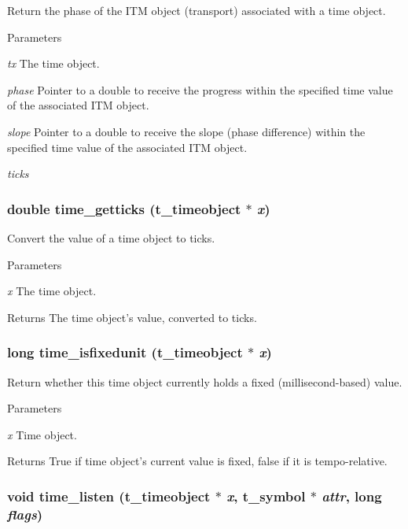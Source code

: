 Return the phase of the ITM object (transport) associated with a time object. 
\begin{DoxyParams}{Parameters}
\item[{\em tx}]The time object. \item[{\em phase}]Pointer to a double to receive the progress within the specified time value of the associated ITM object. \item[{\em slope}]Pointer to a double to receive the slope (phase difference) within the specified time value of the associated ITM object. \item[{\em ticks}]\end{DoxyParams}
\hypertarget{group__time_ga4f47a0932158cafd04fb2e0cc928b4cc}{
\subsubsection[{time\_\-getticks}]{\setlength{\rightskip}{0pt plus 5cm}double time\_\-getticks ({\bf t\_\-timeobject} $\ast$ {\em x})}}
\label{group__time_ga4f47a0932158cafd04fb2e0cc928b4cc}


Convert the value of a time object to ticks. 
\begin{DoxyParams}{Parameters}
\item[{\em x}]The time object. \end{DoxyParams}
\begin{DoxyReturn}{Returns}
The time object's value, converted to ticks. 
\end{DoxyReturn}
\hypertarget{group__time_ga86feb1c21b06217bf699447babb169c5}{
\subsubsection[{time\_\-isfixedunit}]{\setlength{\rightskip}{0pt plus 5cm}long time\_\-isfixedunit ({\bf t\_\-timeobject} $\ast$ {\em x})}}
\label{group__time_ga86feb1c21b06217bf699447babb169c5}


Return whether this time object currently holds a fixed (millisecond-\/based) value. 
\begin{DoxyParams}{Parameters}
\item[{\em x}]Time object. \end{DoxyParams}
\begin{DoxyReturn}{Returns}
True if time object's current value is fixed, false if it is tempo-\/relative. 
\end{DoxyReturn}
\hypertarget{group__time_gaf8a102f28b262991c6e4c3b79f37b611}{
\subsubsection[{time\_\-listen}]{\setlength{\rightskip}{0pt plus 5cm}void time\_\-listen ({\bf t\_\-timeobject} $\ast$ {\em x}, \/  {\bf t\_\-symbol} $\ast$ {\em attr}, \/  long {\em flags})}}
\label{group__time_gaf8a102f28b262991c6e4c3b79f37b611}


